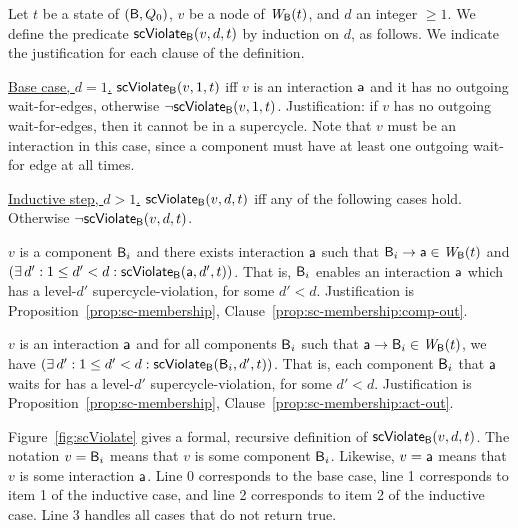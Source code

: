 \label{def:supercycle-violation}
\label{def:supercycle.violation}
Let $t$ be a state of $(\mathsf{B}, Q_0)$, $v$ be a node of $\mathit{W}_{\mathsf{B}}({t})$, and $d$ an integer $\ge 1$.
We define the predicate $\mathsf{scViolate}_{\mathsf{B}}(v,d,t)$ by induction on $d$, as follows. We indicate the
justification for each clause of the definition.

\noindent
\ul{Base case, $d=1$.} $\mathsf{scViolate}_{\mathsf{B}}(v,1,t)$ iff $v$ is an interaction $\mathsf{a}$ and it has no outgoing wait-for-edges, otherwise $\neg \mathsf{scViolate}_{\mathsf{B}}(v,1,t)$.
%
Justification: if $v$ has no outgoing wait-for-edges, then it cannot be in a supercycle.  Note that $v$ must be an
interaction in this case, since a component must have at least one outgoing wait-for edge at all times.

\noindent
\ul{Inductive step, $d > 1$.}  $\mathsf{scViolate}_{\mathsf{B}}(v,d,t)$ iff any of the following cases hold. Otherwise $\neg \mathsf{scViolate}_{\mathsf{B}}(v,d,t)$.

\bn

\item  \label{def:supercycle.violation.component.out}
$v$ is a component $\mathsf{B}_i$ and there exists interaction $\mathsf{a}$ such that $\mathsf{B}_i \rightarrow \mathsf{a} \in \mathit{W}_{\mathsf{B}}({t})$ and $(\exists\, d' : 1 \le d' < d: \mathsf{scViolate}_{\mathsf{B}}(\mathsf{a},d',t))$.
That is, $\mathsf{B}_i$ enables an interaction $\mathsf{a}$ which has a level-$d'$ supercycle-violation, for some $d' < d$.
Justification is Proposition~\ref{prop:sc-membership}, Clause~\ref{prop:sc-membership:comp-out}.


\item \label{def:supercycle.violation.interaction.out}
$v$ is an interaction $\mathsf{a}$ and for all components $\mathsf{B}_i$ such that $\mathsf{a} \rightarrow \mathsf{B}_i \in \mathit{W}_{\mathsf{B}}({t})$, we have $(\exists\, d' : 1 \le d' < d: \mathsf{scViolate}_{\mathsf{B}}(\mathsf{B}_i,d',t))$.
That is, each component $\mathsf{B}_i$ that $\mathsf{a}$ waits for has a level-$d'$ supercycle-violation, for some $d' < d$.
Justification is Proposition~\ref{prop:sc-membership}, Clause~\ref{prop:sc-membership:act-out}.

\en
\ed
%
Figure~\ref{fig:scViolate} gives a formal, recursive definition of $\mathsf{scViolate}_{\mathsf{B}}(v,d,t)$. 
The notation $v = \mathsf{B}_i$ means that $v$ is some component $\mathsf{B}_i$. Likewise, 
$v = \mathsf{a}$ means that $v$ is some interaction $\mathsf{a}$.
Line 0 corresponds to the base case, line 1 corresponds to item 1 of the inductive case, and line 2 corresponds to item 2 of the inductive case.
Line 3 handles all cases that do not return true.




